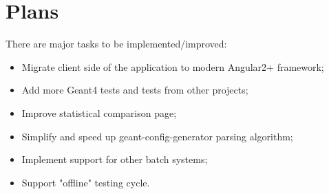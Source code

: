 \section{Plans}
\label{sec-plans}

There are major tasks to be implemented/improved:

\begin{itemize}
	\item Migrate client side of the application to modern Angular2+ framework;
	\item Add more Geant4 tests and tests from other projects;
	\item Improve statistical comparison page;
	\item Simplify and speed up geant-config-generator parsing algorithm;
	\item Implement support for other batch systems;
	\item Support "offline" testing cycle.
\end{itemize}
